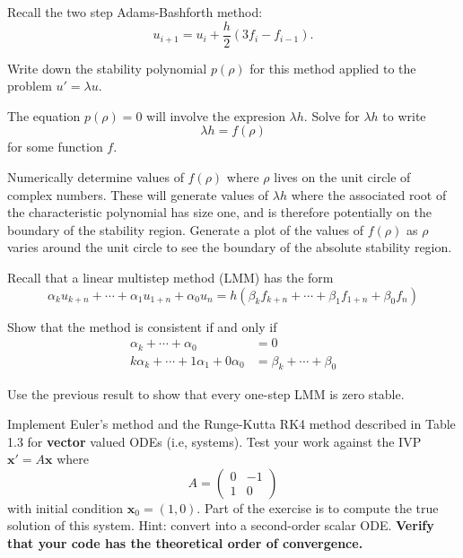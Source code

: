 \documentclass[minion]{homework}
\begin{document}
\begin{problems}

\problem Recall the two step Adams-Bashforth method:
\[
u_{i+1} = u_i + \frac{h}{2}(3f_i-f_{i-1}).
\]
\begin{subproblems}
	\item Write down the stability polynomial $p(\rho)$ for this method applied to the problem $u'=\lambda u$.
	\item The equation $p(\rho)=0$ will involve the expresion $\lambda h$.  Solve for $\lambda h$ to write
	\[
       \lambda h = f(\rho)
	\]
	for some function $f$.
	\item Numerically determine values of $f(\rho)$ where $\rho$ lives on the unit circle of complex numbers.  These will 
	generate values of
	$\lambda h$ where the associated root of the characteristic
	polynomial has size one, and is therefore potentially on the 
	boundary of the stability region. 
	Generate a plot of the values of $f(\rho)$ as $\rho$
	varies around the unit circle to see the boundary of the 
	absolute stability region.
\end{subproblems}

\problem Recall that a linear multistep method (LMM) has the form
\[
\alpha_{k} u_{k+n}+\cdots +\alpha_1 u_{1+n} + \alpha_0 u_n = h(
\beta_{k} f_{k+n}+\cdots +\beta_1 f_{1+n} + \beta_0 f_n
)
\]
\begin{subproblems}
\item Show that the method is consistent if and only if
\begin{equation}
\begin{aligned}
\alpha_{k}+\cdots+\alpha_0 &= 0\\
k\alpha_{k}+\cdots+ 1\alpha_1+0\alpha_0 &= \beta_k+\cdots+\beta_0
\end{aligned}
\end{equation}
\item Use the previous result to show that every one-step LMM
is zero stable.
\end{subproblems}

\problem Implement Euler's method and the Runge-Kutta RK4 method 
described in Table 1.3 for \textbf{vector} valued ODEs (i.e, systems).
Test your work against the IVP $\mathbf x' = A\mathbf x$ where
\[
A = \begin{pmatrix} 0 & -1 \\ 1 & 0 \end{pmatrix}
\]
with initial condition $\mathbf x_0 = (1,0)$.  Part of the exercise
is to compute the true solution of this system.  Hint: convert into
a second-order scalar ODE. \textbf{Verify that your code has the theoretical
order of convergence.}


\end{problems}
\end{document}
